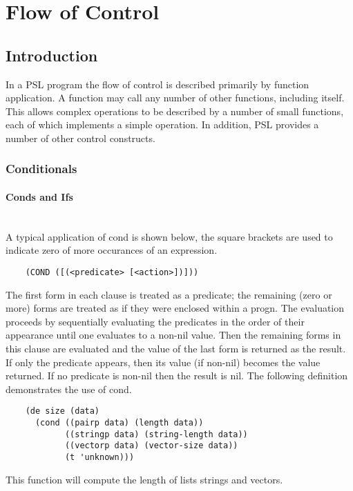 \chapter{Flow of Control}

\section{Introduction}

  In a PSL program the flow of control is described primarily by
function  application.   A function may call any number of other
functions, including itself.  This allows complex operations  to
be  described  by  a  number  of  small functions, each of which
implements a simple operation.   In  addition,  PSL  provides  a
number of other control constructs.

\subsection{Conditionals}

\subsubsection{Conds and Ifs}


\\

{    A  typical  application  of  cond is shown below, the square
    brackets are used to indicate zero of more occurances of  an
    expression.
}\\

\begin{verbatim}
    (COND ([(<predicate> [<action>])]))
\end{verbatim}
   	The first form in each clause is treated as a predicate; the
    remaining  (zero  or more) forms are treated as if they were
    enclosed  within  a  progn.    The  evaluation  proceeds  by
    sequentially evaluating the predicates in the order of their
    appearance until one evaluates to a non-nil value.  Then the
    remaining  forms  in this clause are evaluated and the value
    of the last form is returned as the result.    If  only  the
    predicate  appears,  then its value (if non-nil) becomes the
    value returned.  If no predicate is non-nil then the  result
    is  nil.    The following definition demonstrates the use of
    cond.\\

\begin{verbatim}
    (de size (data)
      (cond ((pairp data) (length data))
            ((stringp data) (string-length data))
            ((vectorp data) (vector-size data))
            (t 'unknown)))
\end{verbatim}
    This function will compute the length of lists  strings
 			and vectors.
			 
